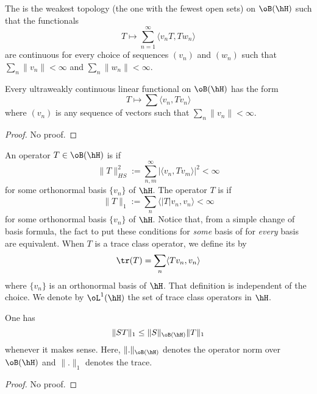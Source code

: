 \begin{definition}
The  is the weakest topology (the one with the fewest open sets) on $\oB(\hH)$ such that the functionals
\begin{equation}
	T\mapsto \sum_{n=1}^{\infty}\langle v_nT, Tw_n\rangle
\end{equation}
are continuous for every choice of sequences $(v_n)$ and $(w_n)$ such that $\sum_n\| v_n \|<\infty$ and $\sum_n\| w_n \|<\infty$.
\end{definition}

\begin{proposition}
Every ultraweakly continuous linear functional on $\oB(\hH)$ has the form
\begin{equation}
	T\mapsto\sum\langle v_n, Tv_n\rangle
\end{equation}
where $(v_n)$ is any sequence of vectors such that $\sum_n\| v_n \|<\infty$.
\end{proposition}

\begin{proof}
No proof.
\end{proof}

An operator $T\in\oB(\hH)$ is  if
\begin{equation}
	\| T \|_{HS}^2:=\sum_{n,m}^{\infty}| \langle v_n, Tv_m\rangle  |^2<\infty
\end{equation}
for some orthonormal basis $\{ v_n \}$ of $\hH$. The operator $T$ is  if
\begin{equation}
	\| T \|_1:=\sum_n\langle | T |v_n, v_n\rangle <\infty
\end{equation}
for some orthonormal basis $\{ v_n \}$ of $\hH$. Notice that, from a simple change of basis formula, the fact to put these conditions for \emph{some} basis of for \emph{every} basis are equivalent. When $T$ is a trace class operator, we define its  by
\begin{equation}
	\tr(T)=\sum_n\langle Tv_n, v_n\rangle
\end{equation}
where $\{ v_n \}$ is an orthonormal basis of $\hH$. That definition is independent of the choice. We denote by $\oL^1(\hH)$ the set of trace class operators in $\hH$.

\begin{proposition}
One has
\begin{equation}
	\| ST \|_1\leq \| S \|_{\oB(\hH)}\| T \|_1
\end{equation}
whenever it makes sense. Here, $\| . \|_{\oB(\hH)}$ denotes the operator norm over $\oB(\hH)$ and $\| . \|_1$ denotes the trace.
\end{proposition}
\begin{proof}
No proof.
\end{proof}

